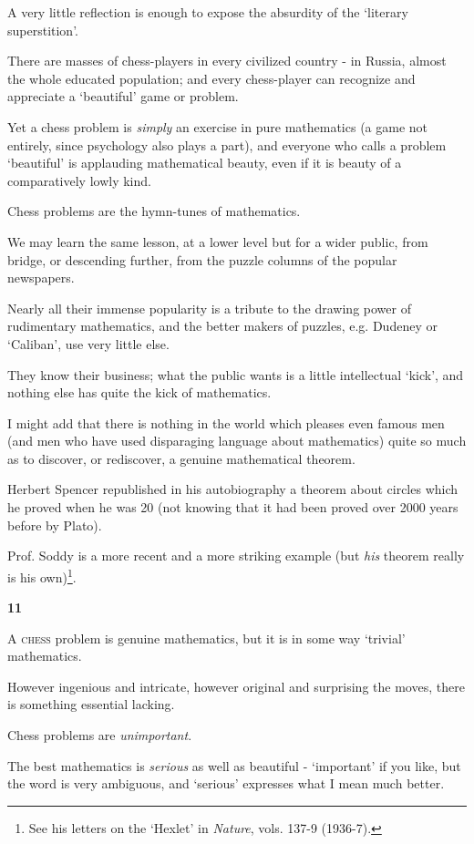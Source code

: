 \documentclass{article}
\numberwithin{equation}{section}
\begin{document}
%
A very little reflection is enough to expose the absurdity of the `literary superstition'.

There are masses of chess-players in every civilized country - in Russia, almost the whole educated population; and every chess-player can recognize and appreciate a `beautiful' game or problem.

Yet a chess problem is \textit{simply} an exercise in pure mathematics (a game not entirely, since psychology also plays a part), and everyone who calls a problem `beautiful' is applauding mathematical beauty, even if it is beauty of a comparatively lowly kind.

Chess problems are the hymn-tunes of mathematics.

%
We may learn the same lesson, at a lower level but for a wider public, from bridge, or descending further, from the puzzle columns of the popular newspapers.

Nearly all their immense popularity is a tribute to the drawing power of rudimentary mathematics, and the better makers of puzzles, e.g. Dudeney or `Caliban', use very little else.

They know their business; what the public wants is a little intellectual `kick', and nothing else has quite the kick of mathematics.

%
I might add that there is nothing in the world which pleases even famous men (and men who have used disparaging language about mathematics) quite so much as to discover, or rediscover, a genuine mathematical theorem.

Herbert Spencer republished in his autobiography a theorem about circles which he proved when he was 20 (not knowing that it had been proved over 2000 years before by Plato).

Prof. Soddy is a more recent and a more striking example (but \textit{his} theorem really is his own)\footnote{See his letters on the `Hexlet' in \textit{Nature}, vols. 137-9 (1936-7).}.

\begin{center}
    \large\textbf{11}
\end{center}
\textsc{A chess} problem is genuine mathematics, but it is in some way `trivial' mathematics.

However ingenious and intricate, however original and surprising the moves, there is something essential lacking.

Chess problems are \textit{unimportant}.

The best mathematics is \textit{serious} as well as beautiful - `important' if you like, but the word is very ambiguous, and `serious' expresses what I mean much better.
\end{document}
